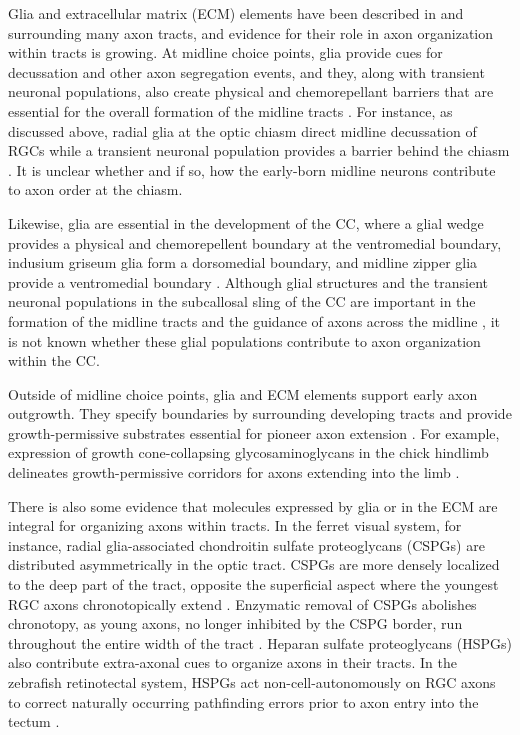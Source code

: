 Glia and extracellular matrix (ECM) elements have been described in and surrounding many axon tracts, and evidence for their role in axon organization within tracts is growing. 
At midline choice points, glia provide cues for decussation and other axon segregation events, and they, along with transient neuronal populations, also create physical and chemorepellant barriers that are essential for the overall formation of the midline tracts \cite{raper2010cellular,suarez2014evolution}. 
For instance, as discussed above, radial glia at the optic chiasm direct midline decussation of RGCs while a transient neuronal population provides a barrier behind the chiasm \cite{raper2010cellular,petros2008retinal}. 
It is unclear whether and if so, how the early-born midline neurons contribute to axon order at the chiasm. 

Likewise, glia are essential in the development of the CC, where a glial wedge provides a physical and chemorepellent boundary at the ventromedial boundary, indusium griseum glia form a dorsomedial boundary, and midline zipper glia provide a ventromedial boundary \cite[reviewed in][]{suarez2014evolution}.
Although glial structures and the transient neuronal populations in the subcallosal sling of the CC are important in the formation of the midline tracts and the guidance of axons across the midline \cite{gobius2016astroglial}, it is not known whether these glial populations contribute to axon organization within the CC.

Outside of midline choice points, glia and ECM elements support early axon outgrowth. 
They specify boundaries by surrounding developing tracts \cite{marcus1995expression} and provide growth-permissive substrates essential for pioneer axon extension \cite{raper2010cellular}. 
For example, expression of growth cone-collapsing glycosaminoglycans in the chick hindlimb delineates growth-permissive corridors for axons extending into the limb \cite{tosney1985development}. 

There is also some evidence that molecules expressed by glia or in the ECM are integral for organizing axons within tracts. 
In the ferret visual system, for instance, radial glia-associated chondroitin sulfate proteoglycans (CSPGs) are distributed asymmetrically in the optic tract.
CSPGs are more densely localized to the deep part of the tract, opposite the superficial aspect where the youngest RGC axons chronotopically extend \cite{reese1997chronotopic}.
Enzymatic removal of CSPGs abolishes chronotopy, as young axons, no longer inhibited by the CSPG border, run throughout the entire width of the tract \cite{leung2003enzymatic}.
Heparan sulfate proteoglycans (HSPGs) also contribute extra-axonal cues to organize axons in their tracts. 
In the zebrafish retinotectal system, HSPGs act non-cell-autonomously on RGC axons to correct naturally occurring pathfinding errors prior to axon entry into the tectum \cite{poulain2013proteoglycan}. 

